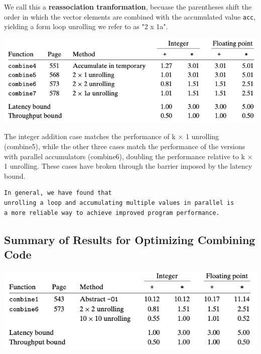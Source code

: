 \documentclass[11pt]{article}
\begin{document}
We call this a \textbf{reassociation tranformation}, becuase the parentheses shift the order in which the vector elements are combined with the accumulated value \texttt{acc}, yielding a form loop unrolling we refer to as "2 x 1a".\\

\begin{center}
\includegraphics[width=.9\linewidth]{pics/combine7-performance.png}
\end{center}

The integer addition case matches the performance of k × 1 unrolling (combine5), while the other three cases match the performance of the versions with parallel accumulators (combine6), doubling the performance relative to k × 1 unrolling. These cases have broken through the barrier imposed by the latency bound.\\

\begin{verbatim}
In general, we have found that
unrolling a loop and accumulating multiple values in parallel is 
a more reliable way to achieve improved program performance.
\end{verbatim}

\subsection{Summary of Results for Optimizing Combining Code}
\label{sec:org0aec771}

\begin{center}
\includegraphics[width=.9\linewidth]{pics/combine-peformance.png}
\end{center}
\end{document}
